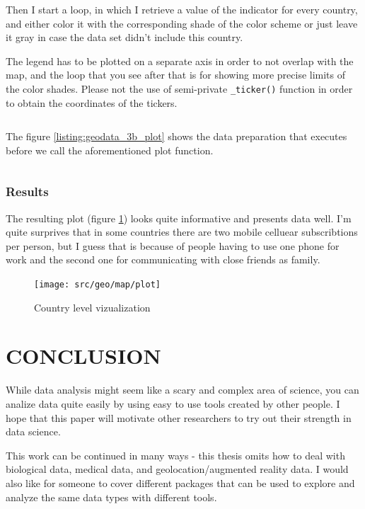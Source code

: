 \documentclass[12pt, a4paper]{article}
\begin{document}
Then I start a loop, in which I retrieve a value of the indicator for every country, and either color it with the corresponding shade of the color scheme or just leave it gray in case the data set didn't include this country.

The legend has to be plotted on a separate axis in order to not overlap with the map, and the loop that you see after that is for showing more precise limits of the color shades. Please not the use of semi-private \texttt{\_ticker()} function in order to obtain the coordinates of the tickers.

\bgroup
  \inputminted[linenos, breaklines=true, fontsize=\scriptsize, firstnumber=last]{python}{src/geo/map/3a_draw_plot.py}
  \label{listing:geodata_3a_draw_plot}
\egroup

The figure \ref{listing:geodata_3b_plot} shows the data preparation that executes before we call the aforementioned plot function.

\bgroup
  \inputminted[linenos, breaklines=true, fontsize=\scriptsize, firstnumber=last]{python}{src/geo/map/3b_plot.py}
  \label{listing:geodata_3b_plot}
\egroup

\subsubsection{Results}
The resulting plot (figure \ref{fig:geo_map}) looks quite informative and presents data well. I'm quite surprives that in some countries there are two mobile celluear subscribtions per person, but I guess that is because of people having to use one phone for work and the second one for communicating with close friends as family.

\begin{figure}[H]
    \centering
    \texttt{[image: src/geo/map/plot]}
    \caption{Country level vizualization}
    \label{fig:geo_map}
\end{figure}

\newpage
\section{CONCLUSION}

While data analysis might seem like a scary and complex area of science, you can analize data quite easily by using easy to use tools created by other people. I hope that this paper will motivate other researchers to try out their strength in data science.

This work can be continued in many ways - this thesis omits how to deal with biological data, medical data, and geolocation/augmented reality data. I would also like for someone to cover different packages that can be used to explore and analyze the same data types with different tools.

\newpage

\printbibliography[heading=bibnumbered, title={REFERENCES}]
\end{document}
